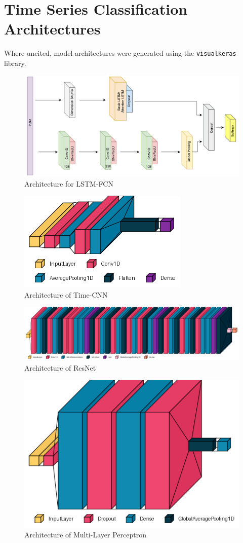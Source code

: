 \chapter{Time Series Classification Architectures}
\label{ch:series-architectures}

Where uncited, model architectures were generated using the \verb|visualkeras| library\cite{Gavrikov2020VisualKeras}.

\begin{figure}[h]
    \centering
    \includegraphics[width=0.75\linewidth]{dissertation//figures/lstm-fcn.png}
    \caption{Architecture for LSTM-FCN\cite{karim2017lstm}}
\end{figure}

\begin{figure}
    \centering
    \includegraphics[width=0.5\linewidth]{dissertation//figures/timecnn.png}
    \caption{Architecture of Time-CNN}
\end{figure}

\begin{figure}
    \centering
    \includegraphics[width=1\linewidth]{dissertation//figures/resnet.png}
    \caption{Architecture of ResNet}
\end{figure}

\begin{figure}
    \centering
    \includegraphics[width=0.5\linewidth]{dissertation//figures/mlp.png}
    \caption{Architecture of Multi-Layer Perceptron}
\end{figure}

